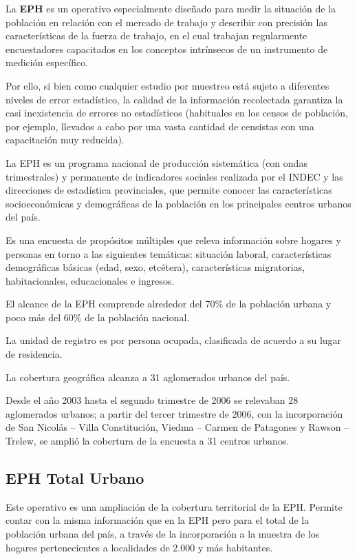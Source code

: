 \documentclass[
  openany]{book}
\begin{document}
La \textbf{EPH} es un operativo especialmente diseñado para medir la situación de la población en relación con el mercado de trabajo y describir con precisión las características de la fuerza de trabajo, en el cual trabajan regularmente encuestadores capacitados en los conceptos intrínsecos de un instrumento de medición específico.

Por ello, si bien como cualquier estudio por muestreo está sujeto a diferentes niveles de error estadístico, la calidad de la información recolectada garantiza la casi inexistencia de errores no estadísticos (habituales en los censos de población, por ejemplo, llevados a cabo por una vasta cantidad de censistas con una capacitación muy reducida).

La EPH es un programa nacional de producción sistemática (con ondas trimestrales) y permanente de indicadores sociales realizada por el INDEC y las direcciones de estadística provinciales, que permite conocer las características socioeconómicas y demográficas de la población en los principales centros urbanos del país.

Es una encuesta de propósitos múltiples que releva información sobre hogares y personas en torno a las siguientes temáticas: situación laboral, características demográficas básicas (edad, sexo, etcétera), características migratorias, habitacionales, educacionales e ingresos.

El alcance de la EPH comprende alrededor del 70\% de la población urbana y poco más del 60\% de la población nacional.

La unidad de registro es por persona ocupada, clasificada de acuerdo a su lugar de residencia.

La cobertura geográfica alcanza a 31 aglomerados urbanos del país.

Desde el año 2003 hasta el segundo trimestre de 2006 se relevaban 28 aglomerados urbanos; a partir del tercer trimestre de 2006, con la incorporación de San Nicolás -- Villa Constitución, Viedma -- Carmen de Patagones y Rawson -- Trelew, se amplió la cobertura de la encuesta a 31 centros urbanos.

\hypertarget{eph-total-urbano}{%
\subsection{EPH Total Urbano}\label{eph-total-urbano}}

Este operativo es una ampliación de la cobertura territorial de la EPH. Permite contar con la misma información que en la EPH pero para el total de la población urbana del país, a través de la incorporación a la muestra de los hogares pertenecientes a localidades de 2.000 y más habitantes.
\end{document}
